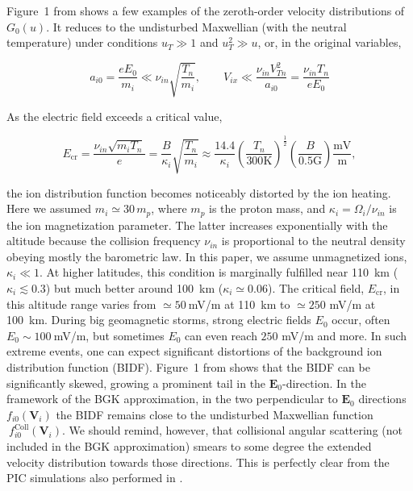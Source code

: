 \documentclass[draft]{agujournal2019}
\renewcommand{\vec}{\mathbf}
\begin{document}
{Figure~1 from  shows a few examples of the zeroth-order velocity distributions of
$G_{0}(u)$. It reduces to the undisturbed Maxwellian (with the neutral
temperature) under conditions $u_{T}\gg1$ and $u_{T}^{2}\gg u$, or, in the
original variables,
\begin{linenomath*}
\begin{equation}
a_{i0}=\frac{eE_{0}}{m_{i}}\ll\nu_{in}\sqrt{\frac{T_{n}}{m_{i}}},\qquad
V_{ix}\ll\frac{\nu_{in}V_{Tn}^{2}}{a_{i0}}=\frac{\nu_{in}T_{n}}{eE_{0}}
\label{<<<}
\end{equation}
\end{linenomath*}
As the electric field exceeds a critical value,
\begin{linenomath*}
\begin{equation}
E_{\mathrm{cr}}=\frac{\nu_{in}\sqrt{m_{i}T_{n}}}{e}=\frac{B}{\kappa_{i}}%
\sqrt{\frac{T_{n}}{m_{i}}}\approx\frac{14.4}{\kappa_{i}}\left(  \frac{T_{n}%
}{300\mathrm{K}}\right)  ^{\frac{1}{2}}\left(  \frac{B}{0.5\mathrm{G}}\right)
\frac{\mathrm{mV}}{\mathrm{m}}, 
\label{E_cr}
\end{equation}
\end{linenomath*}
the ion distribution function becomes noticeably distorted by the ion heating.
Here we assumed $m_{i}\simeq 30\,m_{p}$, where $m_{p}$ is the proton mass, and
$\kappa_{i}=\Omega_{i}/\nu_{in}$ is the ion magnetization parameter. The
latter increases exponentially with the altitude because the collision
frequency $\nu_{in}$ is proportional to the neutral density obeying mostly the
barometric law. In this paper, we assume unmagnetized ions, $\kappa_{i}\ll1$.
At higher latitudes, this condition is marginally fulfilled near 110~km
($\kappa_{i}\lesssim0.3$) but much better around 100~km ($\kappa_{i}
\simeq0.06$). The critical field, $E_{\mathrm{cr}}$, in this altitude range
varies from $\simeq50~$mV/m at 110~km to $\simeq250$ mV/m at 100~km. During
big geomagnetic storms, strong electric fields $E_{0}$ occur, often $E_{0}
\sim100~$mV/m, but sometimes $E_{0}$ can even reach $250$ mV/m and more. In
such extreme events, one can expect significant distortions of the background
ion distribution function (BIDF). Figure~1 from  shows that the BIDF can be
significantly skewed, growing a prominent tail in the $\vec{E}_{0}$-direction.
In the framework of the BGK approximation, in the two perpendicular to
$\vec{E}_{0}$ directions $f_{i0}(\vec{V}_{i})$ the BIDF remains close to the
undisturbed Maxwellian function $\ f_{i0}^{\mathrm{Coll}}(\vec{V}_{i})$. We
should remind, however, that collisional angular scattering (not included in
the BGK approximation) smears to some degree the extended velocity
distribution towards those directions. This is perfectly clear from 
the PIC simulations also performed in .

}
\end{document}
